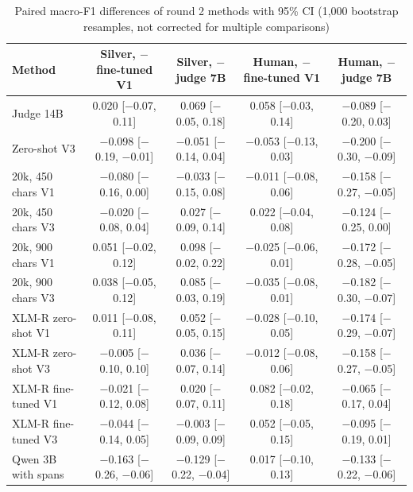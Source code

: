 \documentclass[conference]{IEEEtran}
\begin{document}
\begin{table}[t]
\caption{Paired macro-F1 differences of round 2 methods with 95\% CI (1,000 bootstrap resamples, not corrected for multiple comparisons)}
\label{tab:pairfull}
\centering
\footnotesize
\begin{tabular}{lcccc}
\toprule
Method & Silver, $-$ fine-tuned V1 & Silver, $-$ judge 7B & Human, $-$ fine-tuned V1 & Human, $-$ judge 7B \\
\midrule
Judge 14B & 0.020 [$-$0.07, 0.11] & 0.069 [$-$0.05, 0.18] & 0.058 [$-$0.03, 0.14] & $-$0.089 [$-$0.20, 0.03] \\
Zero-shot V3 & $-$0.098 [$-$0.19, $-$0.01] & $-$0.051 [$-$0.14, 0.04] & $-$0.053 [$-$0.13, 0.03] & $-$0.200 [$-$0.30, $-$0.09] \\
20k, 450 chars V1 & $-$0.080 [$-$0.16, 0.00] & $-$0.033 [$-$0.15, 0.08] & $-$0.011 [$-$0.08, 0.06] & $-$0.158 [$-$0.27, $-$0.05] \\
20k, 450 chars V3 & $-$0.020 [$-$0.08, 0.04] & 0.027 [$-$0.09, 0.14] & 0.022 [$-$0.04, 0.08] & $-$0.124 [$-$0.25, 0.00] \\
20k, 900 chars V1 & 0.051 [$-$0.02, 0.12] & 0.098 [$-$0.02, 0.22] & $-$0.025 [$-$0.06, 0.01] & $-$0.172 [$-$0.28, $-$0.05] \\
20k, 900 chars V3 & 0.038 [$-$0.05, 0.12] & 0.085 [$-$0.03, 0.19] & $-$0.035 [$-$0.08, 0.01] & $-$0.182 [$-$0.30, $-$0.07] \\
XLM-R zero-shot V1 & 0.011 [$-$0.08, 0.11] & 0.052 [$-$0.05, 0.15] & $-$0.028 [$-$0.10, 0.05] & $-$0.174 [$-$0.29, $-$0.07] \\
XLM-R zero-shot V3 & $-$0.005 [$-$0.10, 0.10] & 0.036 [$-$0.07, 0.14] & $-$0.012 [$-$0.08, 0.06] & $-$0.158 [$-$0.27, $-$0.05] \\
XLM-R fine-tuned V1 & $-$0.021 [$-$0.12, 0.08] & 0.020 [$-$0.07, 0.11] & 0.082 [$-$0.02, 0.18] & $-$0.065 [$-$0.17, 0.04] \\
XLM-R fine-tuned V3 & $-$0.044 [$-$0.14, 0.05] & $-$0.003 [$-$0.09, 0.09] & 0.052 [$-$0.05, 0.15] & $-$0.095 [$-$0.19, 0.01] \\
Qwen 3B with spans & $-$0.163 [$-$0.26, $-$0.06] & $-$0.129 [$-$0.22, $-$0.04] & 0.017 [$-$0.10, 0.13] & $-$0.133 [$-$0.22, $-$0.06] \\
\bottomrule
\end{tabular}
\end{table}
\end{document}
